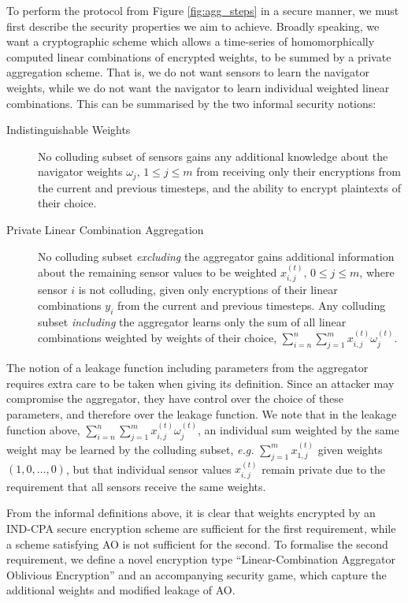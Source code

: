 \documentclass[twocolumn]{autart}
\begin{document}
To perform the protocol from Figure \ref{fig:agg_steps} in a secure manner, we must first describe the security properties we aim to achieve. Broadly speaking, we want a cryptographic scheme which allows a time-series of homomorphically computed linear combinations of encrypted weights, to be summed by a private aggregation scheme. That is, we do not want sensors to learn the navigator weights, while we do not want the navigator to learn individual weighted linear combinations. This can be summarised by the two informal security notions:
\begin{description}
    \item[Indistinguishable Weights] No colluding subset of sensors gains any additional knowledge about the navigator weights $\omega_j,\,1\leq j \leq m$ from receiving only their encryptions from the current and previous timesteps, and the ability to encrypt plaintexts of their choice.
    \item[Private Linear Combination Aggregation] No colluding subset \textit{excluding} the aggregator gains additional information about the remaining sensor values to be weighted $x^{(t)}_{i,j},\,0\leq j\leq m$, where sensor $i$ is not colluding, given only encryptions of their linear combinations $y_i$ from the current and previous timesteps. Any colluding subset \textit{including} the aggregator learns only the sum of all linear combinations weighted by weights of their choice, $\sum^n_{i=n}\sum^m_{j=1}x^{(t)}_{i,j}\omega^{(t)}_j$.
\end{description}

\begin{rem}
    The notion of a leakage function including parameters from the aggregator requires extra care to be taken when giving its definition. Since an attacker may compromise the aggregator, they have control over the choice of these parameters, and therefore over the leakage function. We note that in the leakage function above, $\sum^n_{i=n}\sum^m_{j=1}x^{(t)}_{i,j}\omega^{(t)}_j$, an individual sum weighted by the same weight may be learned by the colluding subset, \textit{e.g.} $\sum^m_{j=1}x^{(t)}_{1,j}$ given weights $(1,0,\dots,0)$, but that individual sensor values $x^{(t)}_{i,j}$ remain private due to the requirement that all sensors receive the same weights.
\end{rem}

From the informal definitions above, it is clear that weights encrypted by an IND-CPA secure encryption scheme are sufficient for the first requirement, while a scheme satisfying AO is not sufficient for the second. To formalise the second requirement, we define a novel encryption type ``Linear-Combination Aggregator Oblivious Encryption'' and an accompanying security game, which capture the additional weights and modified leakage of AO.
\end{document}
